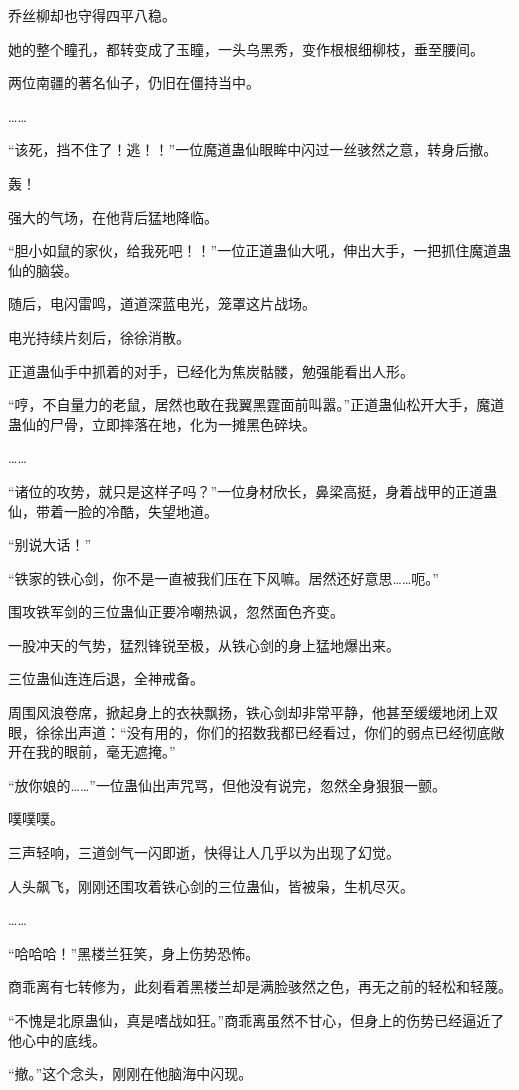 \begin{this_body}
乔丝柳却也守得四平八稳。

她的整个瞳孔，都转变成了玉瞳，一头乌黑秀，变作根根细柳枝，垂至腰间。

两位南疆的著名仙子，仍旧在僵持当中。

……

“该死，挡不住了！逃！！”一位魔道蛊仙眼眸中闪过一丝骇然之意，转身后撤。

轰！

强大的气场，在他背后猛地降临。

“胆小如鼠的家伙，给我死吧！！”一位正道蛊仙大吼，伸出大手，一把抓住魔道蛊仙的脑袋。

随后，电闪雷鸣，道道深蓝电光，笼罩这片战场。

电光持续片刻后，徐徐消散。

正道蛊仙手中抓着的对手，已经化为焦炭骷髅，勉强能看出人形。

“哼，不自量力的老鼠，居然也敢在我翼黑霆面前叫嚣。”正道蛊仙松开大手，魔道蛊仙的尸骨，立即摔落在地，化为一摊黑色碎块。

……

“诸位的攻势，就只是这样子吗？”一位身材欣长，鼻梁高挺，身着战甲的正道蛊仙，带着一脸的冷酷，失望地道。

“别说大话！”

“铁家的铁心剑，你不是一直被我们压在下风嘛。居然还好意思……呃。”

围攻铁军剑的三位蛊仙正要冷嘲热讽，忽然面色齐变。

一股冲天的气势，猛烈锋锐至极，从铁心剑的身上猛地爆出来。

三位蛊仙连连后退，全神戒备。

周围风浪卷席，掀起身上的衣袂飘扬，铁心剑却非常平静，他甚至缓缓地闭上双眼，徐徐出声道：“没有用的，你们的招数我都已经看过，你们的弱点已经彻底敞开在我的眼前，毫无遮掩。”

“放你娘的……”一位蛊仙出声咒骂，但他没有说完，忽然全身狠狠一颤。

噗噗噗。

三声轻响，三道剑气一闪即逝，快得让人几乎以为出现了幻觉。

人头飙飞，刚刚还围攻着铁心剑的三位蛊仙，皆被枭，生机尽灭。

……

“哈哈哈！”黑楼兰狂笑，身上伤势恐怖。

商乖离有七转修为，此刻看着黑楼兰却是满脸骇然之色，再无之前的轻松和轻蔑。

“不愧是北原蛊仙，真是嗜战如狂。”商乖离虽然不甘心，但身上的伤势已经逼近了他心中的底线。

“撤。”这个念头，刚刚在他脑海中闪现。


\end{this_body}

